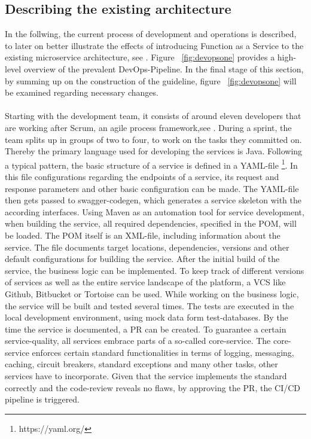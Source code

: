 \documentclass[11pt]{article}
\begin{document}
\subsection{Describing the existing architecture}
In the follwing, the current process of development and operations is described, to later on better illustrate the effects of introducing Function as a Service to the existing microservice architecture, see \cite{newman2015building}. Figure ~\ref{fig:devopsone} provides a high-level overview of the prevalent DevOps-Pipeline. In the final stage of this section, by summing up on the construction of the guideline, figure ~\ref{fig:devopsone} will be examined regarding necessary changes.\\\\ Starting with the development team, it consists of around eleven developers that are working after Scrum, an agile process framework,see \cite{pichler2013scrum}. During a sprint, the team splits up in groups of two to four, to work on the tasks they committed on. Thereby the primary language used for developing the services is Java. Following a typical pattern, the basic structure of a service is defined in a YAML-file \footnote{https://yaml.org/}. In this file configurations regarding the endpoints of a service, its request and response parameters and other basic configuration can be made. The YAML-file then gets passed to swagger-codegen, which generates a service skeleton with the according interfaces. Using Maven as an automation tool for service development, when building the service, all required dependencies, specified in the POM, will be loaded. The POM itself is an XML-file, including information about the service. The file documents target locations, dependencies, versions and other default configurations for building the service. After the initial build of the service, the business logic can be implemented. To keep track of different versions of services as well as the entire service landscape of the platform, a VCS like Github, Bitbucket or Tortoise can be used. While working on the business logic, the service will be built and tested several times. The tests are executed in the local development environment, using mock data form test-databases. By the time the service is documented, a PR can be created. To guarantee a certain service-quality, all services embrace parts of a so-called core-service. The core-service enforces certain standard functionalities in terms of logging, messaging, caching, circuit breakers, standard exceptions and many other tasks, other services have to incorporate. Given that the service implements the standard correctly and the code-review reveals no flaws, by approving the PR, the CI/CD pipeline is triggered.    
\end{document}
